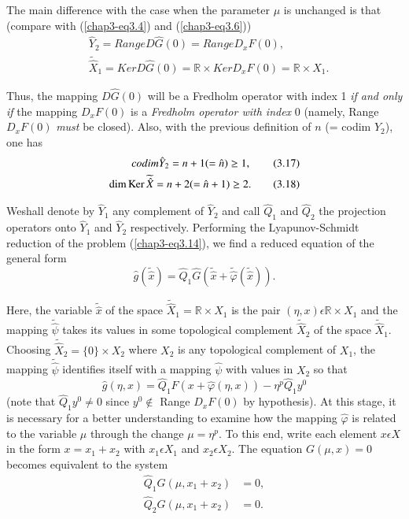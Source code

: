 The main difference with the case when the parameter $\mu$ is
un\-cha\-nged is that (compare with (\ref{chap3-eq3.4}) and
(\ref{chap3-eq3.6}))
\begin{align*}
& \hat{Y}_{2} = Range D\hat{G}(0) = Range D_{x}F(0),\tag{3.15}\label{chap3-eq3.15}\\
& \widetilde{\hat{X}}_{1} = Ker D\hat{G}(0) = \mathbb{R} \times Ker
  D_{x}F(0) = \mathbb{R} \times X_{1}.\tag{3.16}\label{chap3-eq3.16}
\end{align*}

Thus, the mapping $D\hat{G}(0)$ will be a Fredholm operator with index
1 {\em if and only if} the mapping $D_{x}F(0)$ is a {\em Fredholm
  operator with index} 0 (namely, Range $D_{x}F(0)$ {\em must} be
closed). Also, with the previous definition of $n$ (= codim $Y_{2}$),
one has
\begin{align*}
codim \hat{Y}_{2} = n + 1 (= \hat{n}) \geq 1,\tag{3.17}\label{chap3-eq3.17}\\
\dim \operatorname{Ker} \widetilde{\hat{X}} = n + 2 (= \hat{n} + 1) \geq 2.\tag{3.18}\label{chap3-eq3.18}
\end{align*}

We\pageoriginale shall denote by $\hat{Y}_{1}$ any complement of
$\hat{Y}_{2}$ and call $\hat{Q}_{1}$ and $\hat{Q}_{2}$ the projection
operators onto $\hat{Y}_{1}$ and $\hat{Y}_{2}$
respectively. Performing the Lyapunov-Schmidt reduction of the problem
(\ref{chap3-eq3.14}), we find a reduced equation of the general form 
$$
\hat{g}(\widetilde{\hat{x}}) = \hat{Q}_{1} \hat{G} 
(\widetilde{\hat{x}} + \widetilde{\hat{\varphi}} (\widetilde{\hat{x}})).
$$

Here, the variable $\widetilde{\hat{x}}$ of the space
$\widetilde{\hat{X}}_{1} = \mathbb{R} \times X_{1}$ is the pair
$(\eta, x) \epsilon \mathbb{R} \times X_{1}$ and the mapping
$\widetilde{\hat{\psi}}$ takes its values in some topological
complement $\widetilde{\hat{X}}_{2}$ of the space
$\widetilde{\hat{X}}_{1}$. Choosing $\widetilde{\hat{X}}_{2} = \{0\}
\times X_{2}$ where $X_{2}$ is any topological complement of $X_{1}$,
the mapping $\widetilde{\hat{\psi}}$ identifies itself with a
mapping $\hat{\psi}$ with values in $X_{2}$ so that
$$
\hat{g}(\eta, x) = \hat{Q}_{1}F(x + \hat{\varphi}(\eta, x)) - \eta^{p}\hat{Q}_{1}y^{0}
$$
(note that $\hat{Q}_{1} y^{0} \neq 0$ since $y^{0} \notin$ Range
$D_{x}F(0)$ by hypothesis). At this stage, it is necessary for a
better understanding to examine how the mapping $\hat{\varphi}$ is
related to the variable $\mu$ through the change $\mu = \eta^{p}$. To
this end, write each element $x \epsilon X$ in the form $x = x_{1} +
x_{2}$ with $x_{1} \epsilon X_{1}$ and $x_{2} \epsilon X_{2}$. The
equation $G(\mu, x) = 0$ becomes equivalent to the system
\begin{align*}
\hat{Q}_{1}G(\mu, x_{1} + x_{2}) & = 0,\\
\hat{Q}_{2}G(\mu, x_{1} + x_{2}) & = 0.
\end{align*}

